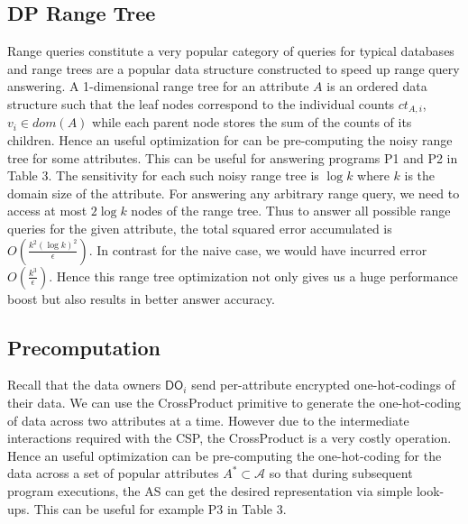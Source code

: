 \subsection{DP Range Tree}
 Range queries constitute a very popular category of queries for typical databases and range trees are a popular data structure constructed to speed up range query answering. A 1-dimensional range tree for an attribute $A$ is an ordered data structure such that the leaf nodes correspond to the individual counts $ct_{A,i}$, $v_i \in dom(A)$ while each parent node stores the sum of the counts of its children. Hence an useful optimization for \system can be pre-computing the noisy range tree for some attributes. This can be useful for answering programs P1 and P2 in Table 3. %
 The sensitivity for each such noisy range tree is $\log k$ where $k$ is the domain size of the attribute. For answering any arbitrary range query, we need to access at most $2\log k$ nodes of the range tree. Thus to answer all possible range queries for the given attribute, the total squared error accumulated is $O(\frac{k^2(\log k)^2 }{\epsilon})$. In contrast for the naive case, we would have incurred error $O(\frac{k^3}{\epsilon})$. Hence this range tree optimization not only gives us a huge performance boost but also results in better answer accuracy. \\


\subsection{Precomputation}  
Recall that the data owners $\textsf{DO}_i$ send per-attribute encrypted one-hot-codings of their data. We can use the \textsf{CrossProduct} primitive to generate the one-hot-coding of data across two attributes at a time. However due to the intermediate interactions required with the \textsf{CSP}, the \textsf{CrossProduct} is a very costly operation. Hence an  useful optimization can be pre-computing the one-hot-coding for the data across a set of popular attributes $A^* \subset \mathcal{A}$ so that during subsequent program executions, the \textsf{AS} can get the desired representation via simple look-ups.  This can be useful for example P3 in Table 3.

